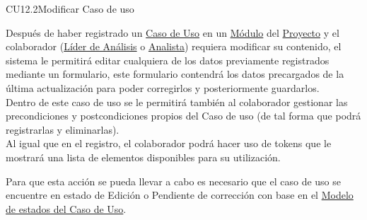 	\begin{UseCase}{CU12.2}{Modificar Caso de uso}{
			
		Después de haber registrado un \hyperlink{casoUso}{Caso de Uso} en un \hyperlink{moduloEntidad}{Módulo} del \hyperlink{proyectoEntidad}{Proyecto} y el colaborador (\hyperlink{jefe}{Líder de Análisis} o \hyperlink{analista}{Analista}) requiera modificar su contenido, el sistema le permitirá editar cualquiera de los datos previamente registrados mediante un formulario, este formulario contendrá los datos precargados de la última actualización para poder corregirlos y posteriormente guardarlos.\\
		Dentro de este caso de uso se le permitirá también al colaborador gestionar las precondiciones y postcondiciones propios del Caso de uso (de tal forma que podrá registrarlas y eliminarlas).\\
	    Al igual que en el registro, el colaborador podrá hacer uso de tokens que le mostrará una lista de elementos disponibles para su utilización.
		
		Para que esta acción se pueda llevar a cabo es necesario que el caso de uso se encuentre en estado de Edición o Pendiente de corrección con base en el \hyperlink{edoCU}{Modelo de estados del Caso de Uso}.

}


\end{UseCase}

